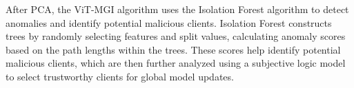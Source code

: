 \documentclass[conference]{IEEEtran}
\begin{document}






After PCA, the ViT-MGI algorithm uses the Isolation Forest algorithm to detect anomalies and identify potential malicious clients. Isolation Forest constructs trees by randomly selecting features and split values, calculating anomaly scores based on the path lengths within the trees. These scores help identify potential malicious clients, which are then further analyzed using a subjective logic model to select trustworthy clients for global model updates.
\end{document}
